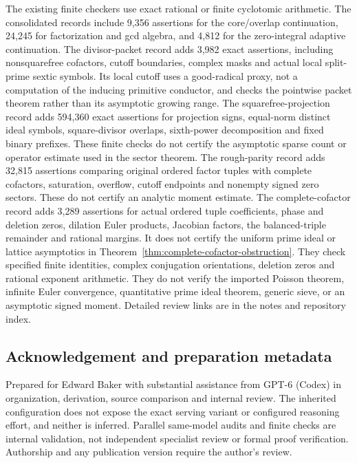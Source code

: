 \documentclass[11pt]{article}
\numberwithin{equation}{section}
\theoremstyle{definition}
\theoremstyle{remark}
\begin{document}
The existing finite checkers use exact rational or finite cyclotomic
arithmetic. The consolidated records include 9,356 assertions for
the core/overlap continuation, 24,245 for factorization and gcd
algebra, and 4,812 for the zero-integral adaptive continuation.
The divisor-packet record adds 3,982 exact assertions, including
nonsquarefree cofactors, cutoff boundaries, complex masks and actual
local split-prime sextic symbols. Its local cutoff uses a good-radical
proxy, not a computation of the inducing primitive conductor, and checks
the pointwise packet theorem rather than its asymptotic growing range.
The squarefree-projection record adds 594,360 exact assertions for
projection signs, equal-norm distinct ideal symbols, square-divisor
overlaps, sixth-power decomposition and fixed binary prefixes.
These finite checks do not certify the asymptotic sparse count or
operator estimate used in the sector theorem.
The rough-parity record adds 32,815 assertions comparing original ordered
factor tuples with complete cofactors, saturation, overflow, cutoff
endpoints and nonempty signed zero sectors. These do not certify an
analytic moment estimate.
The complete-cofactor record adds 3,289 assertions for actual ordered
tuple coefficients, phase and deletion zeros, dilation Euler products,
Jacobian factors, the balanced-triple remainder and rational margins.
It does not certify the uniform prime ideal or lattice asymptotics
in Theorem~\ref{thm:complete-cofactor-obstruction}.
They check specified finite identities, complex conjugation
orientations, deletion zeros and rational exponent arithmetic.
They do not verify the imported Poisson theorem, infinite Euler
convergence, quantitative prime ideal theorem, generic sieve,
or an asymptotic signed moment. Detailed review links are in
the notes and repository index.

\subsection*{Acknowledgement and preparation metadata}

Prepared for Edward Baker with substantial assistance from GPT-6
(Codex) in organization, derivation, source comparison and internal
review. The inherited configuration does not expose the exact serving
variant or configured reasoning effort, and neither is inferred.
Parallel same-model audits and finite checks are internal validation,
not independent specialist review or formal proof verification.
Authorship and any publication version require the author's review.
\end{document}
